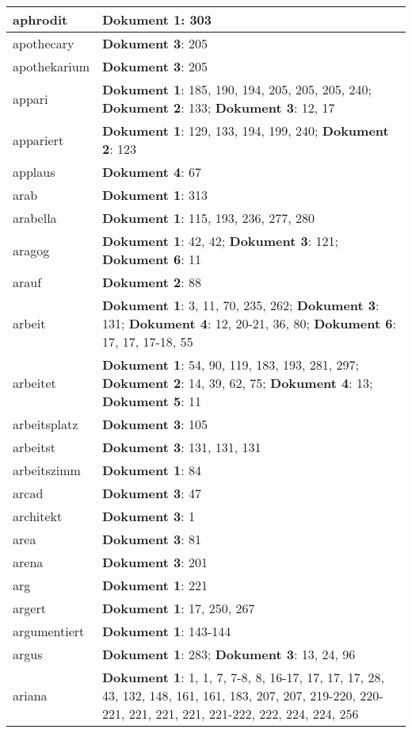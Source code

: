 \documentclass[a5paper]{article}
\begin{document}
\begin{longtable}[l]{|l|p{3in}|}
\hline
aphrodit & \textbf{Dokument 1}: 303 \\
\hline
apothecary & \textbf{Dokument 3}: 205 \\
\hline
apothekarium & \textbf{Dokument 3}: 205 \\
\hline
appari & \textbf{Dokument 1}: 185, 190, 194, 205, 205, 205, 240; \textbf{Dokument 2}: 133; \textbf{Dokument 3}: 12, 17 \\
\hline
appariert & \textbf{Dokument 1}: 129, 133, 194, 199, 240; \textbf{Dokument 2}: 123 \\
\hline
applaus & \textbf{Dokument 4}: 67 \\
\hline
arab & \textbf{Dokument 1}: 313 \\
\hline
arabella & \textbf{Dokument 1}: 115, 193, 236, 277, 280 \\
\hline
aragog & \textbf{Dokument 1}: 42, 42; \textbf{Dokument 3}: 121; \textbf{Dokument 6}: 11 \\
\hline
arauf & \textbf{Dokument 2}: 88 \\
\hline
arbeit & \textbf{Dokument 1}: 3, 11, 70, 235, 262; \textbf{Dokument 3}: 131; \textbf{Dokument 4}: 12, 20-21, 36, 80; \textbf{Dokument 6}: 17, 17, 17-18, 55 \\
\hline
arbeitet & \textbf{Dokument 1}: 54, 90, 119, 183, 193, 281, 297; \textbf{Dokument 2}: 14, 39, 62, 75; \textbf{Dokument 4}: 13; \textbf{Dokument 5}: 11 \\
\hline
arbeitsplatz & \textbf{Dokument 3}: 105 \\
\hline
arbeitst & \textbf{Dokument 3}: 131, 131, 131 \\
\hline
arbeitszimm & \textbf{Dokument 1}: 84 \\
\hline
arcad & \textbf{Dokument 3}: 47 \\
\hline
architekt & \textbf{Dokument 3}: 1 \\
\hline
area & \textbf{Dokument 3}: 81 \\
\hline
arena & \textbf{Dokument 3}: 201 \\
\hline
arg & \textbf{Dokument 1}: 221 \\
\hline
argert & \textbf{Dokument 1}: 17, 250, 267 \\
\hline
argumentiert & \textbf{Dokument 1}: 143-144 \\
\hline
argus & \textbf{Dokument 1}: 283; \textbf{Dokument 3}: 13, 24, 96 \\
\hline
ariana & \textbf{Dokument 1}: 1, 1, 7, 7-8, 8, 16-17, 17, 17, 17, 28, 43, 132, 148, 161, 161, 183, 207, 207, 219-220, 220-221, 221, 221, 221, 221-222, 222, 224, 224, 256 \\

\end{longtable}
\end{document}
